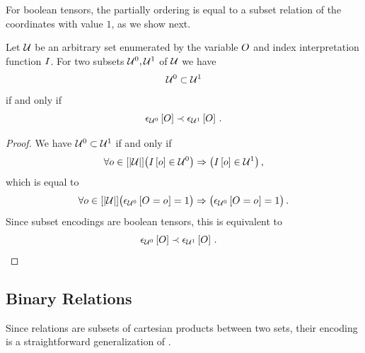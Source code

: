 For boolean tensors, the partially ordering is equal to a subset relation of the coordinates with value $1$, as we show next.

\begin{theorem}
    \label{the:subsetRelationSubsetEncoding}
    Let $\mathcal{U}$ be an arbitrary set enumerated by the variable $O$ and index interpretation function $I$.
    For two subsets $\mathcal{U}^{0},\mathcal{U}^{1}$ of $\mathcal{U}$ we have
    \begin{align*}
        \mathcal{U}^{0} \subset \mathcal{U}^{1}
    \end{align*}
    if and only if
    \begin{align*}
        \epsilon_{\mathcal{U}^{0}}\left[O\right] \prec \epsilon_{\mathcal{U}^{1}}\left[O\right] \, .
    \end{align*}
\end{theorem}
\begin{proof}
    We have $\mathcal{U}^{0} \subset \mathcal{U}^{1}$ if and only if
    \begin{align*}
        \forall{o\in[\left|\mathcal{U}\right|]} \big(I\left[o\right]\in\mathcal{U}^{0}\big) \Rightarrow \big(I\left[o\right]\in\mathcal{U}^{1}\big) \, ,
    \end{align*}
    which is equal to
    \begin{align*}
        \forall{o\in[\left|\mathcal{U}\right|]} \big(\epsilon_{\mathcal{U}^{0}}\left[O_{}=o_{}\right]=1\big) \Rightarrow \big(\epsilon_{\mathcal{U}^{0}}\left[O_{}=o_{}\right]=1\big)  \, .
    \end{align*}
    Since subset encodings are boolean tensors, this is equivalent to
    \begin{align*}
        \epsilon_{\mathcal{U}^{0}}\left[O\right] \prec \epsilon_{\mathcal{U}^{1}}\left[O\right] \, . & \qedhere
    \end{align*}
\end{proof}

\subsection{Binary Relations}


Since relations are subsets of cartesian products between two sets, their encoding is a straightforward generalization of .

